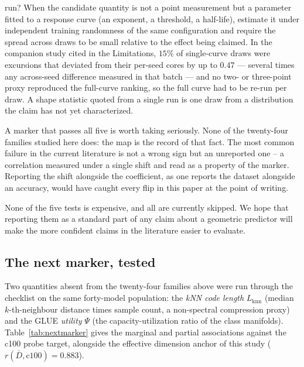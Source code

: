 \documentclass[10pt]{article}
\begin{document}
\begin{enumerate}
{      run?} When the candidate quantity is not a point measurement but a
      parameter fitted to a response curve (an exponent, a threshold, a
      half-life), estimate it under independent training randomness of the
      same configuration and require the spread across draws to be small
      relative to the effect being claimed. In the companion study cited
      in the Limitations, $15\%$ of single-curve draws were excursions
      that deviated from their per-seed cores by up to $0.47$ ---
      several times any across-seed difference measured in that batch
      --- and no two- or three-point proxy reproduced the full-curve
      ranking, so the full curve had to be re-run per draw. A shape
      statistic quoted from a single run is one draw from a
      distribution the claim has not yet characterized.
\end{enumerate}

A marker that passes all five is worth taking seriously. None of the
twenty-four families studied here does: the map is the record of that fact.
The most common failure in the current literature is not a wrong sign but an
unreported one -- a correlation measured under a single shift and read as a
property of the marker. Reporting the shift alongside the coefficient, as one
reports the dataset alongside an accuracy, would have caught every flip in
this paper at the point of writing.

None of the five tests is expensive, and all are currently skipped. We hope
that reporting them as a standard part of any claim about a geometric
predictor will make the more confident claims in the literature easier to
evaluate.


\subsection{The next marker, tested}
\label{sec:nextmarker}

Two quantities absent from the twenty-four families above were run through the
checklist on the same forty-model population: the \emph{kNN code length}
$L_{\mathrm{knn}}$ (median $k$-th-neighbour distance times sample count, a
non-spectral compression proxy) and the GLUE \emph{utility} $\Psi$ (the
capacity-utilization ratio of the class manifolds).
Table~\ref{tab:nextmarker} gives the marginal and partial associations against
the c100 probe target, alongside the effective dimension anchor of this study
($r(\bar D, \mathrm{c100}) = 0.883$).
\end{document}
